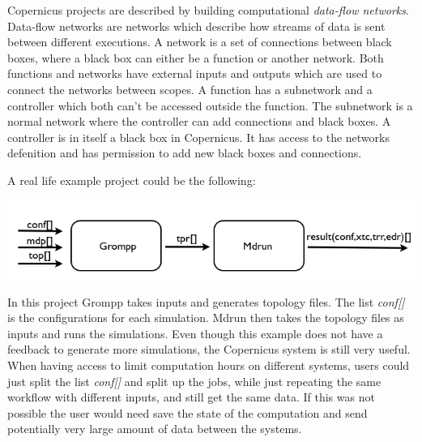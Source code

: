 Copernicus projects are described by building computational
\emph{data-flow networks}. Data-flow networks are networks which
describe how streams of data is sent between different executions.  A
network is a set of connections between black boxes, where a black box
can either be a function or another network. Both functions and
networks have external inputs and outputs which are used to connect
the networks between scopes. A function has a subnetwork and a
controller which both can't be accessed outside the function. The
subnetwork is a normal network where the controller can add
connections and black boxes. A controller is in itself a black box in
Copernicus. It has access to the networks defenition and has
permission to add new black boxes and connections.

%

A real life example project could be the following:

\begin{center}
\includegraphics[scale=0.4]{Chapters/IntroductionIncludes/example.png}
\end{center}

In this project Grompp takes inputs and generates topology files. The
list \emph{conf[]} is the configurations for each simulation. Mdrun
then takes the topology files as inputs and runs the simulations. Even
though this example does not have a feedback to generate more
simulations, the Copernicus system is still very useful. When having
access to limit computation hours on different systems, users could
just split the list \emph{conf[]} and split up the jobs, while just
repeating the same workflow with different inputs, and still get the
same data. If this was not possible the user would need save the state
of the computation and send potentially very large amount of data
between the systems.


